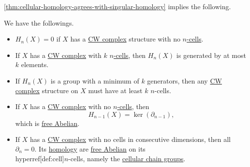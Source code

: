 \autoref{thm:cellular-homology-agrees-with-singular-homology} implies the following.
\begin{corollary}\label{col:lec-32}
	We have the followings.
	\begin{itemize}
		\item \(H_n(X) = 0\) if \(X\) has a \hyperref[def:CW-Complex]{CW complex} structure with no \hyperref[def:cell]{\(n\)-cells}.
		\item If \(X\) has a \hyperref[def:CW-Complex]{CW complex} with \(k\) \hyperref[def:cell]{\(n\)-cells}, then \(H_n(X)\) is generated by at most \(k\) elements.
		\item If \(H_n(X)\) is a group with a minimum of \(k\) generators, then any \hyperref[def:CW-Complex]{CW complex} structure on \(X\) must have at least \(k\) \(n\)-cells.
		\item If \(X\) has a \hyperref[def:CW-Complex]{CW complex} with no \hyperref[def:cell]{\(n\)-cells}, then
		      \[
			      H_{n-1}(X) = \ker (\partial _{n-1}),
		      \]
		      which is \hyperref[def:free-Abelian-group]{free Abelian}.
		\item If \(X\) has a \hyperref[def:CW-Complex]{CW complex} with no cells in consecutive dimensions, then all \(\partial _n=0\).
		      Its \hyperref[def:cellular-homology-group]{homology} are \hyperref[def:free-Abelian-group]{free Abelian} on its \\hyperref[def:cell]{\(n\)-cells},
		      namely the \hyperref[def:cellular-chain-complex]{cellular chain groups}.
	\end{itemize}
\end{corollary}
